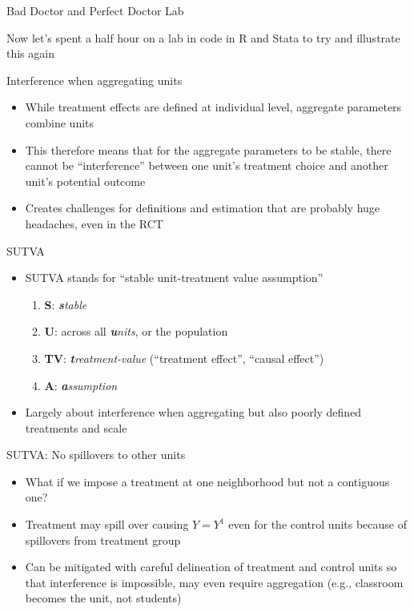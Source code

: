 \documentclass{beamer}
\begin{document}
\begin{frame}{Bad Doctor and Perfect Doctor Lab}

Now let's spent a half hour on a lab in code in R and Stata to try and illustrate this again

\end{frame}

\begin{frame}{Interference when aggregating units}

\begin{itemize}
\item While treatment effects are defined at individual level, aggregate parameters combine units
\item This therefore means that for the aggregate parameters to be stable, there cannot be ``interference'' between one unit's treatment choice and another unit's potential outcome
\item Creates challenges for definitions and estimation that are probably huge headaches, even in the RCT
\end{itemize}

\end{frame}

\begin{frame}{SUTVA}

  \begin{itemize}
    \item SUTVA stands for ``stable unit-treatment value assumption''
          \begin{enumerate}
            \item \textbf{S}: \emph{\textbf{s}table}
            \item \textbf{U}: across all \emph{\textbf{u}nits}, or the population
            \item \textbf{TV}: \emph{\textbf{t}reatment-value} (``treatment effect'', ``causal effect'')
            \item \textbf{A}: \emph{\textbf{a}ssumption}
          \end{enumerate}
    \item Largely about interference when aggregating but also poorly defined treatments and scale
  \end{itemize}
\end{frame}


\begin{frame}{SUTVA: No spillovers to other units}

  \begin{itemize}
    \item What if we impose a treatment at one neighborhood but not a contiguous one?
    \item Treatment may spill over causing $Y=Y^1$ even for the control units because of spillovers from treatment group
    \item Can be mitigated with careful delineation of treatment and control units so that interference is impossible, may even require aggregation (e.g., classroom becomes the unit, not students)
  \end{itemize}
\end{frame}
\end{document}
